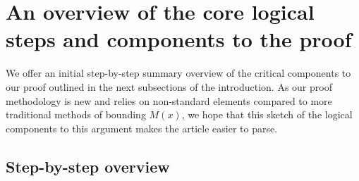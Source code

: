 \documentclass[11pt,reqno,a4letter]{article}
\numberwithin{figure}{section}
\numberwithin{table}{section}
\theoremstyle{plain}
\numberwithin{theorem}{section}
\theoremstyle{definition}
\begin{document}
\newpage
\section{An overview of the core logical steps and components to the proof} 

We offer an initial step-by-step summary overview of the critical components 
to our proof outlined in the next subsections of the introduction. 
As our proof methodology is new and relies on non-standard elements compared to more 
traditional methods of bounding $M(x)$, we hope that this sketch of the logical components 
to this argument makes the article easier to parse. 

\subsection{Step-by-step overview} 
\end{document}
